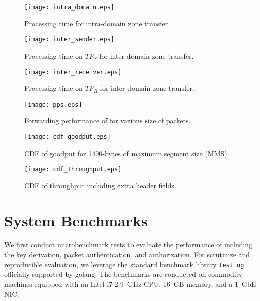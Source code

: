  \begin{figure*}[h]
 	\begin{minipage}{.32\linewidth}
 		\centering
 		\texttt{[image: intra\_domain.eps]}
 		\caption{Processing time for intra-domain zone transfer.}
 		\label{fig:intra}
 	\end{minipage}\hspace*{1em}
 	\begin{minipage}{.32\linewidth}
 		\centering
 		\texttt{[image: inter\_sender.eps]}
 		\caption{Processing time on $TP_S$ for inter-domain zone transfer.}
 		\label{fig:inter_sender}
 	\end{minipage}\hspace*{1em}
 	\begin{minipage}{.32\linewidth}
 		\centering
 		\texttt{[image: inter\_receiver.eps]}
 		\caption{Processing time on $TP_R$ for inter-domain zone transfer.}
 		\label{fig:inter_receiver}
 	\end{minipage}
 \end{figure*}

\begin{figure*}[!htb]
	\begin{minipage}{.32\linewidth}
		\centering
		\texttt{[image: pps.eps]}
		\caption{Forwarding performance of \tp for various size of packets.}
		\label{fig:forwarding}
	\end{minipage}\hspace*{1em}
	\begin{minipage}{.32\linewidth}
		\centering
		\texttt{[image: cdf\_goodput.eps]}
		\caption{CDF of goodput for 1400-bytes of maximum segment size (MMS).}
		\label{fig:goodput}
	\end{minipage}\hspace*{1em}
	\begin{minipage}{.32\linewidth}
		\centering
		\texttt{[image: cdf\_throughput.eps]}
		\caption{CDF of throughput including extra header fields.}
		\label{fig:throughput}
	\end{minipage}
\end{figure*}

\section{System Benchmarks}
\label{sec:systembenchmark}

We first conduct microbenchmark tests to evaluate the performance of \tp including the key
derivation, packet authentication, and authorization. For scrutinize and reproducible evaluation, 
we leverage the standard benchmark library \texttt{testing} officially supported by golang. 
The benchmarks are conducted on commodity machines equipped with an Intel i7 \SI{2.9}{GHz} 
CPU, \SI{16}{GB} memory, and a \SI{1}{GbE} NIC.

